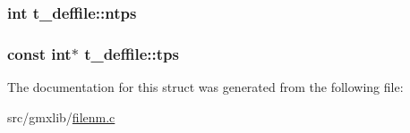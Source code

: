 \hypertarget{structt__deffile_ab8fd38479ff324f0fc3fda473c62bc2f}{
\subsubsection[{ntps}]{\setlength{\rightskip}{0pt plus 5cm}int {\bf t\-\_\-deffile\-::ntps}}}\label{structt__deffile_ab8fd38479ff324f0fc3fda473c62bc2f}
\hypertarget{structt__deffile_a70aad7ee8be48deb09bb7d1392ff42ab}{
\subsubsection[{tps}]{\setlength{\rightskip}{0pt plus 5cm}const int$\ast$ {\bf t\-\_\-deffile\-::tps}}}\label{structt__deffile_a70aad7ee8be48deb09bb7d1392ff42ab}


\-The documentation for this struct was generated from the following file\-:\begin{DoxyCompactItemize}
\item 
src/gmxlib/\hyperlink{filenm_8c}{filenm.\-c}\end{DoxyCompactItemize}
